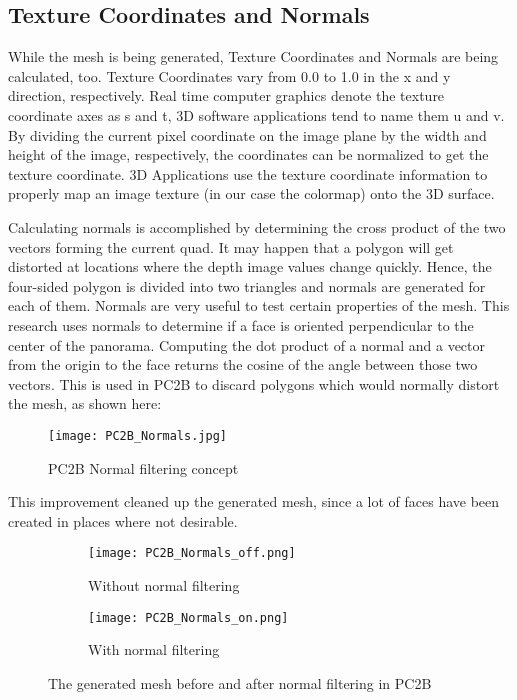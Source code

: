 \subsection{Texture Coordinates and Normals}

While the mesh is being generated, Texture Coordinates and Normals are being calculated, too. Texture Coordinates vary from 0.0 to 1.0 in the x and y direction, respectively. Real time computer graphics denote the texture coordinate axes as s and t, 3D software applications tend to name them u and v. By dividing the current pixel coordinate on the image plane by the width and height of the image, respectively, the coordinates can be normalized to get the texture coordinate. 3D Applications use the texture coordinate information to properly map an image texture (in our case the colormap) onto the 3D surface.

Calculating normals is accomplished by determining the cross product of the two vectors forming the current quad. It may happen that a polygon will get distorted at locations where the depth image values change quickly. Hence, the four-sided polygon is divided into two triangles and normals are generated for each of them. Normals are very useful to test certain properties of the mesh. This research uses normals to determine if a face is oriented perpendicular to the center of the panorama. Computing the dot product of a normal and a vector from the origin to the face returns the cosine of the angle between those two vectors. This is used in PC2B to discard polygons which would normally distort the mesh, as shown here:

\begin{figure}[h]
	\centering
	\texttt{[image: PC2B\_Normals.jpg]}
	\caption{PC2B Normal filtering concept}
	\label{fig:pc2b_normals}
\end{figure}

This improvement cleaned up the generated mesh, since a lot of faces have been created in places where not desirable.


\begin{figure}[h]
	\centering
	\begin{subfigure}[b]{0.45\textwidth}
		\centering
		\texttt{[image: PC2B\_Normals\_off.png]}
		\caption{Without normal filtering}
		\label{fig:PC2B_normals_off}
	\end{subfigure}
	\hfill
	\begin{subfigure}[b]{0.45\textwidth}
		\centering
		\texttt{[image: PC2B\_Normals\_on.png]}
		\caption{With normal filtering}
		\label{fig:PC2B_normals_on}
	\end{subfigure}
	\caption{The generated mesh before and after normal filtering in PC2B}
	\label{fig:PC2B_normal_filtering}
\end{figure}


